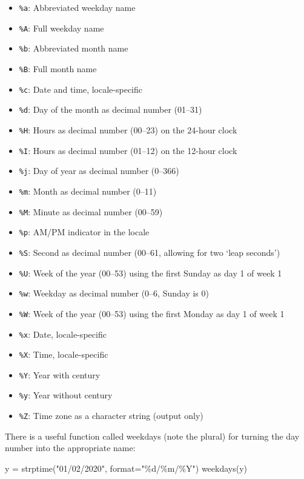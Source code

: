 \documentclass[
]{book}
\newenvironment{Shaded}{\begin{snugshade}}{\end{snugshade}}
\newcommand{\AttributeTok}[1]{\textcolor[rgb]{0.77,0.63,0.00}{#1}}
\newcommand{\FunctionTok}[1]{\textcolor[rgb]{0.00,0.00,0.00}{#1}}
\newcommand{\NormalTok}[1]{#1}
\newcommand{\OtherTok}[1]{\textcolor[rgb]{0.56,0.35,0.01}{#1}}
\newcommand{\StringTok}[1]{\textcolor[rgb]{0.31,0.60,0.02}{#1}}
\providecommand{\tightlist}{%
  \setlength{\itemsep}{0pt}\setlength{\parskip}{0pt}}
\theoremstyle{definition}
\theoremstyle{definition}
\theoremstyle{definition}
\theoremstyle{definition}
\theoremstyle{remark}
\begin{document}
\begin{itemize}
\tightlist
\item
  \texttt{\%a}: Abbreviated weekday name
\item
  \texttt{\%A}: Full weekday name
\item
  \texttt{\%b}: Abbreviated month name
\item
  \texttt{\%B}: Full month name
\item
  \texttt{\%c}: Date and time, locale-specific
\item
  \texttt{\%d}: Day of the month as decimal number (01--31)
\item
  \texttt{\%H}: Hours as decimal number (00--23) on the 24-hour clock
\item
  \texttt{\%I}: Hours as decimal number (01--12) on the 12-hour clock
\item
  \texttt{\%j}: Day of year as decimal number (0--366)
\item
  \texttt{\%m}: Month as decimal number (0--11)
\item
  \texttt{\%M}: Minute as decimal number (00--59)
\item
  \texttt{\%p}: AM/PM indicator in the locale
\item
  \texttt{\%S}: Second as decimal number (00--61, allowing for two `leap seconds')
\item
  \texttt{\%U}: Week of the year (00--53) using the first Sunday as day 1 of week 1
\item
  \texttt{\%w}: Weekday as decimal number (0--6, Sunday is 0)
\item
  \texttt{\%W}: Week of the year (00--53) using the first Monday as day 1 of week 1
\item
  \texttt{\%x}: Date, locale-specific
\item
  \texttt{\%X}: Time, locale-specific
\item
  \texttt{\%Y}: Year with century
\item
  \texttt{\%y}: Year without century
\item
  \texttt{\%Z}: Time zone as a character string (output only)
\end{itemize}

There is a useful function called weekdays (note the plural) for turning the day number into the appropriate name:

\begin{Shaded}
\begin{Highlighting}[]
\NormalTok{y }\OtherTok{=} \FunctionTok{strptime}\NormalTok{(}\StringTok{"01/02/2020"}\NormalTok{, }\AttributeTok{format=}\StringTok{"\%d/\%m/\%Y"}\NormalTok{)}
\FunctionTok{weekdays}\NormalTok{(y)}
\end{Highlighting}
\end{Shaded}
\end{document}
